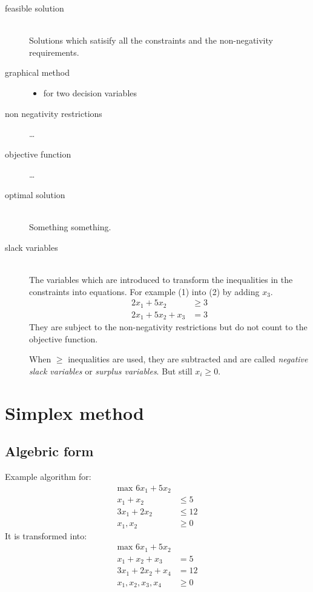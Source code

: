 \documentclass[12pt]{article}
\begin{document}
\begin{description}
\item[feasible solution] \hfill \\
    Solutions which satisify all the constraints and the non-negativity
    requirements.

\item[graphical method] \hfill
    \begin{itemize}
    \item for two decision variables
    \end{itemize}
    
\item[non negativity restrictions] \ldots

\item[objective function] \ldots

\item[optimal solution] \hfill \\
    Something something.
    
\item[slack variables] \hfill \\
    The variables which are introduced to transform the inequalities in the
    constraints into equations. For example (1) into (2) by adding $x_3$.
    \begin{align}
        2x_1+5x_2&\ge3\\
        2x_1+5x_2+x_3&=3
    \end{align}
    They are subject to the non-negativity restrictions but do not count to the
    objective function.
    
    When $\ge$ inequalities are used, they are subtracted and are called
    \emph{negative slack variables} or \emph{surplus variables}. But still
    $x_i \ge 0$.

\end{description}

\section{Simplex method}

\subsection{Algebric form}

Example algorithm for:
\begin{align*}
    \text{max } 6x_1 + 5x_2 \\
    x_1 + x_2 &\le 5 \\
    3x_1 + 2x_2 &\le 12 \\
    x_1,x_2 &\ge 0
\end{align*}
It is transformed into:
\begin{align*}
    \text{max } 6x_1 + 5x_2 \\
    x_1 + x_2 + x_3 &= 5 \\
    3x_1 + 2x_2 + x_4 &= 12 \\
    x_1,x_2,x_3,x_4 &\ge 0
\end{align*}
\end{document}
